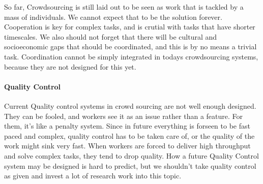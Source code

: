 \documentclass{sig-alternate}
\begin{document}
So far, Crowdsourcing is still laid out to be seen as work that is tackled by a mass of individuals. We cannot expect that to be the solution forever.
Cooperation is key for complex tasks, and is crutial with tasks that have shorter timescales. We also should not forget that there will be cultural and 
socioeconomic gaps that should be coordinated, and this is by no means a trivial task. Coordination cannot be simply integrated in todays crowdsourcing systems, because they are not designed for this yet.

\paragraph{Quality Control}

Current Quality control systems in crowd sourcing are not well enough designed. They can be fooled, and workers see it as an issue rather than a feature. For them, it's like a penalty system.
Since in future everything is forseen to be fast paced and complex, quality control has to be taken care of, or the quality of the work might sink very fast.
When workers are forced to deliver high throughput and solve complex tasks, they tend to drop quality. How a future Quality Control system may be designed is hard to predict, but we shouldn't take quality control as given and invest a lot of research work into this topic.








%

\end{document}
